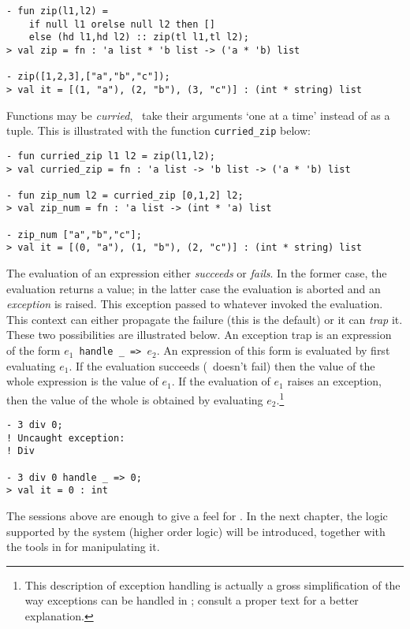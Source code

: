 \begin{session}
\begin{verbatim}
- fun zip(l1,l2) =
    if null l1 orelse null l2 then []
    else (hd l1,hd l2) :: zip(tl l1,tl l2);
> val zip = fn : 'a list * 'b list -> ('a * 'b) list

- zip([1,2,3],["a","b","c"]);
> val it = [(1, "a"), (2, "b"), (3, "c")] : (int * string) list
\end{verbatim}
\end{session}

Functions may be {\it curried\/}, \ie\ take their arguments `one at a time'
instead of as a tuple.  This is illustrated with the function
{\small\verb|curried_zip|} below:

\begin{session}
\begin{verbatim}
- fun curried_zip l1 l2 = zip(l1,l2);
> val curried_zip = fn : 'a list -> 'b list -> ('a * 'b) list

- fun zip_num l2 = curried_zip [0,1,2] l2;
> val zip_num = fn : 'a list -> (int * 'a) list

- zip_num ["a","b","c"];
> val it = [(0, "a"), (1, "b"), (2, "c")] : (int * string) list
\end{verbatim}
\end{session}

The evaluation of an expression either {\it succeeds\/} or {\it
  fails\/}.  In the former case, the evaluation returns a value; in
the latter case the evaluation is aborted and an \emph{exception} is
raised.  This exception passed to whatever invoked the evaluation.
This context can either propagate the failure (this is the default) or
it can {\it trap\/} it. These two possibilities are illustrated below.
An exception trap is an expression of the form
$e_1${\small\verb| handle _ => |}$e_2$. An expression of this form is
evaluated by first evaluating $e_1$. If the evaluation succeeds (\ie\
doesn't fail) then the value of the whole expression is the value of
$e_1$.  If the evaluation of $e_1$ raises an exception, then the value
of the whole is obtained by evaluating $e_2$.\footnote{This
  description of exception handling is actually a gross simplification
  of the way exceptions can be handled in \ML{}; consult a proper text
  for a better explanation.}

\begin{session}
\begin{verbatim}
- 3 div 0;
! Uncaught exception:
! Div

- 3 div 0 handle _ => 0;
> val it = 0 : int
\end{verbatim}
\end{session}

The sessions above are enough to give a feel for \ML.  In the next
chapter, the logic supported by the \HOL{} system (higher order logic)
will be introduced, together with the tools in \ML{} for manipulating
it.

